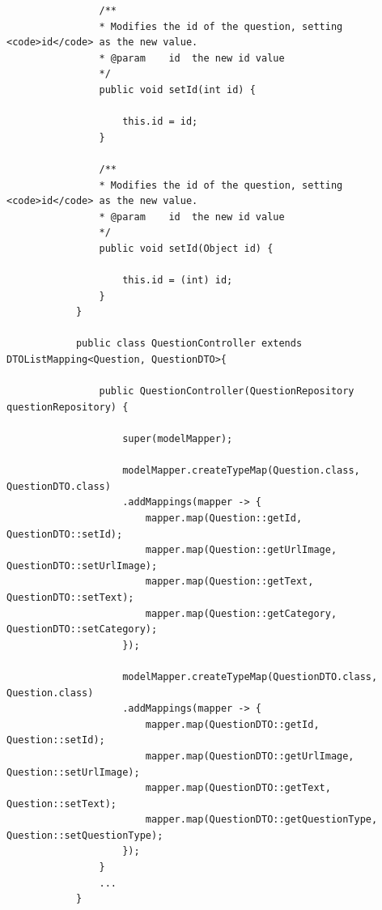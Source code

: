 \documentclass[12pt]{article}
\begin{document}
\begin{itemize}
\begin{lstlisting}
				/**
				* Modifies the id of the question, setting <code>id</code> as the new value.
				* @param	id	the new id value
				*/
				public void setId(int id) {
					
					this.id = id;
				}
				
				/**
				* Modifies the id of the question, setting <code>id</code> as the new value.
				* @param	id	the new id value
				*/
				public void setId(Object id) {
					
					this.id = (int) id;
				}
			}
			
			public class QuestionController extends DTOListMapping<Question, QuestionDTO>{
				
				public QuestionController(QuestionRepository questionRepository) {
					
					super(modelMapper);
					
					modelMapper.createTypeMap(Question.class, QuestionDTO.class)
					.addMappings(mapper -> {
						mapper.map(Question::getId, QuestionDTO::setId);
						mapper.map(Question::getUrlImage, QuestionDTO::setUrlImage);
						mapper.map(Question::getText, QuestionDTO::setText);
						mapper.map(Question::getCategory, QuestionDTO::setCategory);
					});
					
					modelMapper.createTypeMap(QuestionDTO.class, Question.class)
					.addMappings(mapper -> {
						mapper.map(QuestionDTO::getId, Question::setId);
						mapper.map(QuestionDTO::getUrlImage, Question::setUrlImage);
						mapper.map(QuestionDTO::getText, Question::setText);
						mapper.map(QuestionDTO::getQuestionType, Question::setQuestionType);
					});
				}
				...
			}
		\end{lstlisting}
	\end{itemize}

	\newpage
\end{document}
